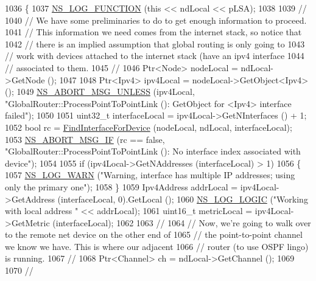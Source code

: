 \begin{DoxyCode}
1036 \{
1037   \hyperlink{log-macros-disabled_8h_a90b90d5bad1f39cb1b64923ea94c0761}{NS\_LOG\_FUNCTION} (\textcolor{keyword}{this} << ndLocal << pLSA);
1038 
1039   \textcolor{comment}{//}
1040   \textcolor{comment}{// We have some preliminaries to do to get enough information to proceed.}
1041   \textcolor{comment}{// This information we need comes from the internet stack, so notice that}
1042   \textcolor{comment}{// there is an implied assumption that global routing is only going to }
1043   \textcolor{comment}{// work with devices attached to the internet stack (have an ipv4 interface}
1044   \textcolor{comment}{// associated to them.}
1045   \textcolor{comment}{//}
1046   Ptr<Node> nodeLocal = ndLocal->GetNode ();
1047 
1048   Ptr<Ipv4> ipv4Local = nodeLocal->GetObject<Ipv4> ();
1049   \hyperlink{group__fatal_ga0bd3f62c55e7347ff814572f3aaa3864}{NS\_ABORT\_MSG\_UNLESS} (ipv4Local, \textcolor{stringliteral}{"GlobalRouter::ProcessPointToPointLink (): GetObject
       for <Ipv4> interface failed"});
1050 
1051   uint32\_t interfaceLocal = ipv4Local->GetNInterfaces () + 1;
1052   \textcolor{keywordtype}{bool} rc = \hyperlink{classns3_1_1GlobalRouter_a7b30c3c09f93e3f3ac7cfe787b51d127}{FindInterfaceForDevice} (nodeLocal, ndLocal, interfaceLocal);
1053   \hyperlink{group__fatal_ga6653324225bc139e46deea177614ceee}{NS\_ABORT\_MSG\_IF} (rc == \textcolor{keyword}{false}, \textcolor{stringliteral}{"GlobalRouter::ProcessPointToPointLink (): No interface
       index associated with device"});
1054 
1055   \textcolor{keywordflow}{if} (ipv4Local->GetNAddresses (interfaceLocal) > 1)
1056     \{
1057       \hyperlink{group__logging_gade7208b4009cdf0e25783cd26766f559}{NS\_LOG\_WARN} (\textcolor{stringliteral}{"Warning, interface has multiple IP addresses; using only the primary one"});
1058     \}
1059   Ipv4Address addrLocal = ipv4Local->GetAddress (interfaceLocal, 0).GetLocal ();
1060   \hyperlink{group__logging_ga88acd260151caf2db9c0fc84997f45ce}{NS\_LOG\_LOGIC} (\textcolor{stringliteral}{"Working with local address "} << addrLocal);
1061   uint16\_t metricLocal = ipv4Local->GetMetric (interfaceLocal);
1062 
1063   \textcolor{comment}{//}
1064   \textcolor{comment}{// Now, we're going to walk over to the remote net device on the other end of }
1065   \textcolor{comment}{// the point-to-point channel we know we have.  This is where our adjacent }
1066   \textcolor{comment}{// router (to use OSPF lingo) is running.}
1067   \textcolor{comment}{//}
1068   Ptr<Channel> ch = ndLocal->GetChannel ();
1069 
1070   \textcolor{comment}{//}

\end{DoxyCode}
